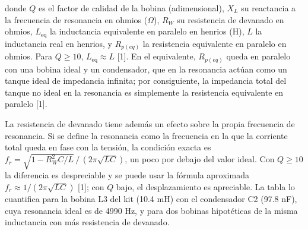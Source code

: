 \documentclass[11pt,letterpaper]{article}
\begin{document}
donde $Q$ es el factor de calidad de la bobina (adimensional), $X_L$ su reactancia a la frecuencia de resonancia en ohmios (\ensuremath{\Omega}), $R_W$ su resistencia de devanado en ohmios, $L_{\mathrm{eq}}$ la inductancia equivalente en paralelo en henrios (H), $L$ la inductancia real en henrios, y $R_{p(eq)}$ la resistencia equivalente en paralelo en ohmios. Para $Q \geq 10$, $L_{\mathrm{eq}} \approx L$ [1]. En el equivalente, $R_{p(eq)}$ queda en paralelo con una bobina ideal y un condensador, que en la resonancia actúan como un tanque ideal de impedancia infinita; por consiguiente, la impedancia total del tanque no ideal en la resonancia es simplemente la resistencia equivalente en paralelo [1].

La resistencia de devanado tiene además un efecto sobre la propia frecuencia de resonancia. Si se define la resonancia como la frecuencia en la que la corriente total queda en fase con la tensión, la condición exacta es $f_r = \sqrt{1 - R_W^2 C/L}\,/\,(2\pi\sqrt{LC})$, un poco por debajo del valor ideal. Con $Q \geq 10$ la diferencia es despreciable y se puede usar la fórmula aproximada $f_r \approx 1/(2\pi\sqrt{LC})$ [1]; con $Q$ bajo, el desplazamiento es apreciable. La tabla lo cuantifica para la bobina L3 del kit (10.4 mH) con el condensador C2 (97.8 nF), cuya resonancia ideal es de 4990 Hz, y para dos bobinas hipotéticas de la misma inductancia con más resistencia de devanado.
\end{document}
